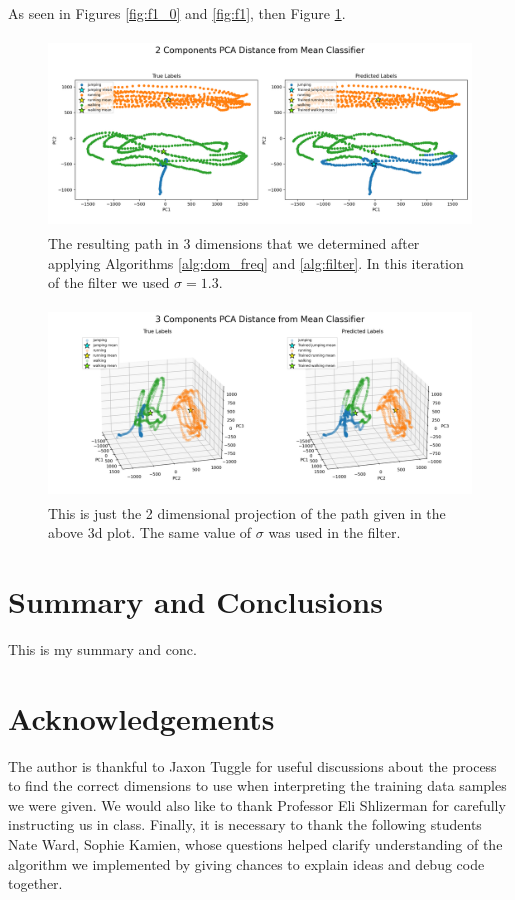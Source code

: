 \documentclass[11pt]{amsart}
\begin{document}
As seen in Figures \ref{fig:f1_0} and \ref{fig:f1}, then Figure \ref{fig:f2}.

\begin{figure}[h]
	\centering
	\includegraphics[height=2in]{../visualizations/pca_distance_from_mean_classifier_2d.png}
 	\caption{The resulting path in 3 dimensions that we determined after applying Algorithms \ref{alg:dom_freq} and \ref{alg:filter}. In this iteration of the filter we used $\sigma=1.3$.}\label{fig:f2}
\end{figure}

\begin{figure}[h]
	\centering
	\includegraphics[height=2in]{../visualizations/pca_distance_from_mean_classifier_3d.png}
 	\caption{This is just the 2 dimensional projection of the path given in the above 3d plot. The same value of $\sigma$ was used in the filter.}\label{fig:f3}
\end{figure}

\section{Summary and Conclusions}\label{sec:conclusions}
This is my summary and conc.

\section*{Acknowledgements} 

The author is thankful to Jaxon Tuggle for useful discussions about the process to find the correct dimensions to use when interpreting the training data samples we were given.
We would also like to thank Professor Eli Shlizerman for carefully instructing us in class.
Finally, it is necessary to thank the following students Nate Ward, Sophie Kamien, whose questions helped clarify understanding of the algorithm we implemented by giving chances to explain ideas and debug code together.


\end{document}
